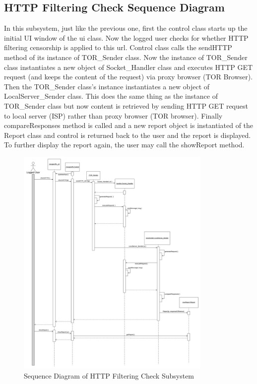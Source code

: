 \documentclass[12pt]{article}
\begin{document}
\subsection{HTTP Filtering Check Sequence Diagram}
In this subsystem, just like the previous one, first the control class starts up the initial UI window of the ui class. Now the logged user checks for whether HTTP filtering censorship is applied to this url. Control class calls the sendHTTP method of its instance of TOR\_Sender class. Now the instance of TOR\_Sender class instantiates a new object of Socket\_Handler class and executes HTTP GET request (and keeps the content of the request) via proxy browser (TOR Browser). Then the TOR\_Sender class's instance instantiates a new object of LocalServer\_Sender class. This does the same thing as the instance of TOR\_Sender class but now content is retrieved by sending HTTP GET request to local server (ISP) rather than proxy browser (TOR browser). Finally compareResponses method is called and a new report object is instantiated of the Report class and control is returned back to the user and the report is displayed. To further display the report again, the user may call the showReport method. 
\begin{figure}[H]
    \centering
    \includegraphics[width=0.84\textwidth]{seq2.png}
    \caption{Sequence Diagram of HTTP Filtering Check Subsystem}
    \label{fig:sdhttp}
\end{figure}
\end{document}
